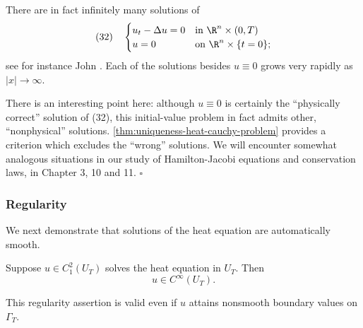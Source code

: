 \begin{remark}
\label{rem:heat-equation-nonphysical-solutions}
There are in fact infinitely many solutions of
$$(32) \quad \begin{cases} u_t - \Delta u = 0 & \text{in } \R^n \times (0,T) \\ u = 0 & \text{on } \R^n \times \{t = 0\}; \end{cases}$$
see for instance John \cite{John1982}. Each of the solutions besides $u \equiv 0$ grows very rapidly as $|x| \to \infty$.

There is an interesting point here: although $u \equiv 0$ is certainly the ``physically correct'' solution of (32), this initial-value problem in fact admits other, ``nonphysical'' solutions. \cref{thm:uniqueness-heat-cauchy-problem} provides a criterion which excludes the ``wrong'' solutions. We will encounter somewhat analogous situations in our study of Hamilton-Jacobi equations and conservation laws, in Chapter 3, 10 and 11. $\square$
\end{remark}

\subsubsection{Regularity}
\label{sec:heat-regularity}

We next demonstrate that solutions of the heat equation are automatically smooth.

\begin{theorem}[Smoothness]
\label{thm:heat-equation-smoothness}
Suppose $u \in C_1^2(U_T)$ solves the heat equation in $U_T$. Then
$$u \in C^\infty(U_T).$$
\end{theorem}

This regularity assertion is valid even if $u$ attains nonsmooth boundary values on $\Gamma_T$.

